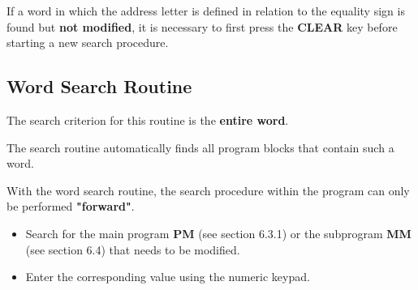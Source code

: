\notes

If a word in which the address letter is defined in relation to the equality sign is found but \textbf{not modified}, it is necessary to first press the \textbf{CLEAR} key before starting a new search procedure.

\newpage

\subsection{Word Search Routine}

The search criterion for this routine is the \textbf{entire word}.

The search routine automatically finds all program blocks that contain such a word.

With the word search routine, the search procedure within the program can only be performed \textbf{"forward"}.

\procedure

\begin{itemize}
    \item Search for the main program \textbf{PM} (see section 6.3.1) or the subprogram \textbf{MM} (see section 6.4) that needs to be modified.
\end{itemize}

\begin{itemize}
\end{itemize}

\vspace{.5cm}

\begin{itemize}
    \item Enter the corresponding value using the numeric keypad.
\end{itemize}

\begin{itemize}
\end{itemize}

\vspace{.5cm}

\begin{itemize}
\end{itemize}

\vspace{.5cm}

